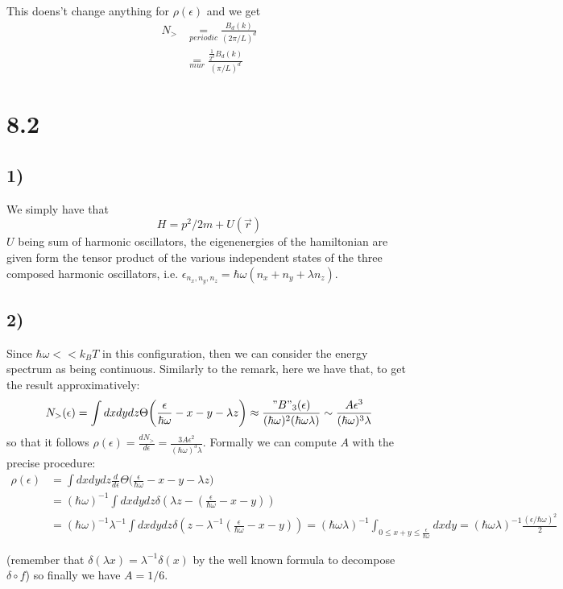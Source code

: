 \documentclass[10pt,a4paper]{book}
\begin{document}
This doens't change anything for $\rho(\epsilon)$ and we get 
\begin{align*}
N_{>}&\underset{periodic}{=}\frac{B_d(k)}{(2\pi/L)^d}\\
&\underset{mur}{=}\frac{\frac{1}{2^d}B_d(k)}{(\pi/L)^d}
\end{align*}




\section*{8.2}

\subsection*{1)}

We simply have that 
$$H=p^2/2m+U(\vec{r})$$
$U$ being sum of harmonic oscillators, the eigenenergies of the hamiltonian are given form the tensor product of the various independent states of the three composed harmonic oscillators, i.e. $\epsilon_{n_x,n_y,n_z}=\hbar\omega(n_x+n_y+\lambda n_z)$. 

\subsection*{2)}
Since $\hbar\omega<<k_BT$ in this configuration, then we can consider the energy spectrum as being continuous. 
Similarly to the remark, here we have that, to get the result approximatively:
$$N_{>}(\epsilon)=\int dx dydz\Theta\bigg(\frac{\epsilon}{\hbar\omega}-x-y-\lambda z\bigg)\approx \frac{"B"_3(\epsilon)}{(\hbar\omega)^2(\hbar\omega\lambda)}\sim \frac{A\epsilon^3}{(\hbar\omega)^3\lambda}$$ so that it follows $\rho(\epsilon)=\frac{dN_>}{d\epsilon}=\frac{3A\epsilon^2}{(\hbar\omega)^3\lambda}$.
Formally we can compute $A$ with the precise procedure:
\begin{align*}
\rho(\epsilon)&=\int dxdydz \frac{d}{d\epsilon}\Theta\bigg(\frac{\epsilon}{\hbar\omega}-x-y-\lambda z\bigg)\\
&=(\hbar\omega)^{-1}\int dxdydz\delta(\lambda z-(\frac{\epsilon}{\hbar \omega}-x-y))\\
&=(\hbar\omega)^{-1}\lambda^{-1}\int dxdydz\delta( z-\lambda^{-1}(\frac{\epsilon}{\hbar\omega}-x-y))=(\hbar\omega\lambda)^{-1}\int_{0\leq x+y\leq\frac{\epsilon}{\hbar\omega}} dxdy=(\hbar\omega\lambda)^{-1}\frac{(\epsilon/\hbar\omega)^2}{2}
\end{align*}

(remember that $\delta(\lambda x)=\lambda^{-1}\delta(x)$ by the well known formula to decompose $\delta\circ f$) so finally we have $A=1/6$.
\end{document}
